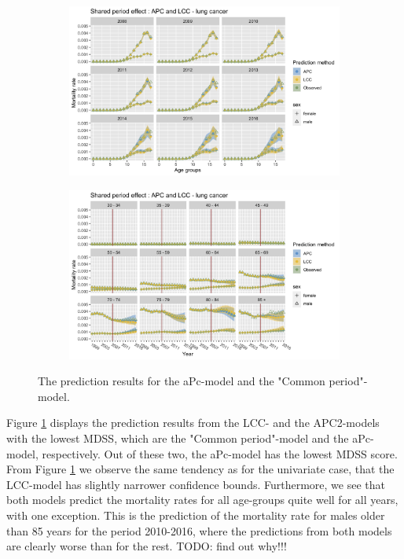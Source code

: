 \begin{figure}
    \centering
    \begin{subfigure}[b]{.45\linewidth}
        \includegraphics[width=\linewidth]{real-data/real-data-multivariate/Figures/multivariate-comparison-by-age-lung.png}
    \end{subfigure}
    \begin{subfigure}[b]{.45\linewidth}
        \includegraphics[width=\linewidth]{real-data/real-data-multivariate/Figures/multivariate-comparison-by-period-lung.png}
    \end{subfigure}
    \caption{The prediction results for the aPc-model and the "Common period"-model.}
    \label{fig:mv-APC-LCC-lung}
\end{figure}

Figure \ref{fig:mv-APC-LCC-lung} displays the prediction results from the LCC- and the APC2-models with the lowest MDSS, which are the "Common period"-model and the aPc-model, respectively. Out of these two, the aPc-model has the lowest MDSS score. From Figure \ref{fig:mv-APC-LCC-lung} we observe the same tendency as for the univariate case, that the LCC-model has slightly narrower confidence bounds. Furthermore, we see that both models predict the mortality rates for all age-groups quite well for all years, with one exception. This is the prediction of the mortality rate for males older than 85 years for the period 2010-2016, where the predictions from both models are clearly worse than for the rest. \textcolor{myDarkGreen}{TODO: find out why!!! }